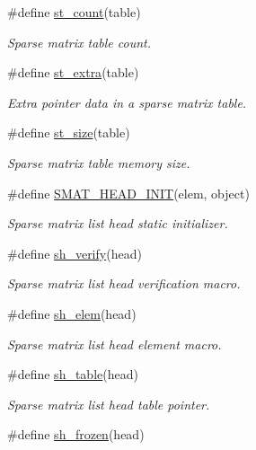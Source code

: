 \begin{CompactItemize}
\#define \hyperlink{group__dbprim__smat_a26}{st\_\-count}(table)
\begin{CompactList}\small\item\em Sparse matrix table count.\item\end{CompactList}\item 
\#define \hyperlink{group__dbprim__smat_a27}{st\_\-extra}(table)
\begin{CompactList}\small\item\em Extra pointer data in a sparse matrix table.\item\end{CompactList}\item 
\#define \hyperlink{group__dbprim__smat_a28}{st\_\-size}(table)
\begin{CompactList}\small\item\em Sparse matrix table memory size.\item\end{CompactList}\item 
\#define \hyperlink{group__dbprim__smat_a29}{SMAT\_\-HEAD\_\-INIT}(elem, object)
\begin{CompactList}\small\item\em Sparse matrix list head static initializer.\item\end{CompactList}\item 
\#define \hyperlink{group__dbprim__smat_a30}{sh\_\-verify}(head)
\begin{CompactList}\small\item\em Sparse matrix list head verification macro.\item\end{CompactList}\item 
\#define \hyperlink{group__dbprim__smat_a31}{sh\_\-elem}(head)
\begin{CompactList}\small\item\em Sparse matrix list head element macro.\item\end{CompactList}\item 
\#define \hyperlink{group__dbprim__smat_a32}{sh\_\-table}(head)
\begin{CompactList}\small\item\em Sparse matrix list head table pointer.\item\end{CompactList}\item 
\#define \hyperlink{group__dbprim__smat_a33}{sh\_\-frozen}(head)

\end{CompactItemize}
